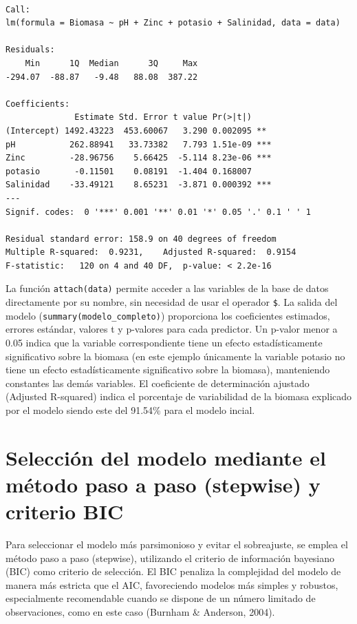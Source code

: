 \documentclass[
  spanish,
  a4paper,
  DIV=11,
  numbers=noendperiod,
  onepage,
  openany]{scrreprt}
\begin{document}
\begin{verbatim}

Call:
lm(formula = Biomasa ~ pH + Zinc + potasio + Salinidad, data = data)

Residuals:
    Min      1Q  Median      3Q     Max 
-294.07  -88.87   -9.48   88.08  387.22 

Coefficients:
              Estimate Std. Error t value Pr(>|t|)    
(Intercept) 1492.43223  453.60067   3.290 0.002095 ** 
pH           262.88941   33.73382   7.793 1.51e-09 ***
Zinc         -28.96756    5.66425  -5.114 8.23e-06 ***
potasio       -0.11501    0.08191  -1.404 0.168007    
Salinidad    -33.49121    8.65231  -3.871 0.000392 ***
---
Signif. codes:  0 '***' 0.001 '**' 0.01 '*' 0.05 '.' 0.1 ' ' 1

Residual standard error: 158.9 on 40 degrees of freedom
Multiple R-squared:  0.9231,    Adjusted R-squared:  0.9154 
F-statistic:   120 on 4 and 40 DF,  p-value: < 2.2e-16
\end{verbatim}

La función \texttt{attach(data)} permite acceder a las variables de la
base de datos directamente por su nombre, sin necesidad de usar el
operador \texttt{\$}. La salida del modelo
(\texttt{summary(modelo\_completo)}) proporciona los coeficientes
estimados, errores estándar, valores t y p-valores para cada predictor.
Un p-valor menor a 0.05 indica que la variable correspondiente tiene un
efecto estadísticamente significativo sobre la biomasa (en este ejemplo
únicamente la variable potasio no tiene un efecto estadísticamente
significativo sobre la biomasa), manteniendo constantes las demás
variables. El coeficiente de determinación ajustado (Adjusted R-squared)
indica el porcentaje de variabilidad de la biomasa explicado por el
modelo siendo este del 91.54\% para el modelo incial.

\section{Selección del modelo mediante el método paso a paso (stepwise)
y criterio
BIC}\label{selecciuxf3n-del-modelo-mediante-el-muxe9todo-paso-a-paso-stepwise-y-criterio-bic}

Para seleccionar el modelo más parsimonioso y evitar el sobreajuste, se
emplea el método paso a paso (stepwise), utilizando el criterio de
información bayesiano (BIC) como criterio de selección. El BIC penaliza
la complejidad del modelo de manera más estricta que el AIC,
favoreciendo modelos más simples y robustos, especialmente recomendable
cuando se dispone de un número limitado de observaciones, como en este
caso (Burnham \& Anderson, 2004).
\end{document}
